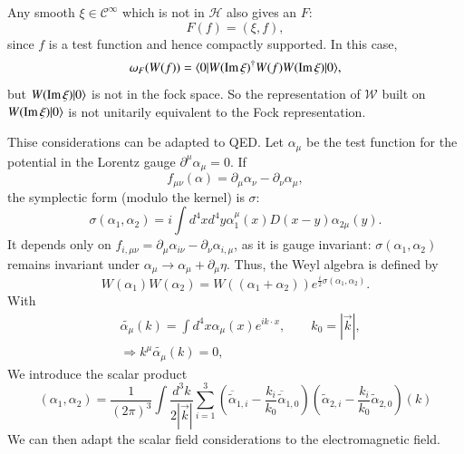 Any smooth $\xi \in \mathcal{C}^\infty$ which is not in $\mathcal{H}$ also gives an $F$:
\begin{equation}
  F(f)= (\xi, f), \label{chap1-eq2.25}
\end{equation}
since $f$ is a test function and hence compactly supported. In this case,
\begin{equation}
\omega_F (W(f))= \langle 0| W (\operatorname{\mathrm{Im}} \xi)^\dagger W (f)W (\operatorname{\mathrm{Im}} \xi)|0\rangle, \label{chap1-eq2.26}
\end{equation}
but $W (\operatorname{\mathrm{Im}} \xi)|0 \rangle$ is not in the fock space. So the representation of $\mathcal{W}$ built on $W (\operatorname{\mathrm{Im}} \xi)|0 \rangle$ is not unitarily equivalent to the Fock representation.

Thise considerations can be adapted to QED. Let $\alpha_\mu$ be the test function for the potential in the Lorentz gauge $\partial^\mu \alpha_\mu =0$. If
\begin{equation}
f_{\mu \nu} (\alpha) = \partial_{\mu} \alpha_{\nu}- \partial_\nu \alpha_\mu, \label{chap1-eq-2.27}
\end{equation}
the symplectic form (modulo the kernel) is $\sigma:$
\begin{equation}
  \sigma (\alpha_1, \alpha_2) = i \int d^4 x d^4 y \alpha^\mu_1 (x) D (x-y) \alpha_{2 \mu} (y). \label{chap1-eq2.28}
\end{equation}
It depends only on $f_{i, \mu \nu}= \partial_\mu \alpha_{i \nu}- \partial_\nu \alpha_{i, \mu}$, as it is gauge invariant: $\sigma(\alpha_1, \alpha_2)$ remains invariant under $\alpha_\mu \to \alpha_\mu + \partial_{\mu} \eta$. Thus, the Weyl algebra is defined by
\begin{equation}
W (\alpha_1) W (\alpha_2)= W ((\alpha_1 + \alpha_2)) e^{\frac{i}{2} \sigma(\alpha_1, \alpha_2)}. \label{chap1-eq2.29}
\end{equation}
With
\begin{align}
  &\tilde{\alpha_\mu} (k) = \int d^4 x \alpha_\mu (x)e^{ik\cdot x}, \qquad k_0 = |\overrightarrow{k}|,\label{chap1-eq2.30}\\
  &\Longrightarrow k^{\mu} \tilde{\alpha_\mu} (k)=0,\label{chap1-eq2.31}
\end{align}
We introduce the scalar product
\begin{equation}
(\alpha_1, \alpha_2)= \frac{1}{(2\pi)^3} \int \frac{d^3 k}{2|\overrightarrow{k}|} \sum^3_{i=1} \left(\overline{\tilde{\alpha}}_{1, i} -  \frac{k_i}{k_0} \overline{\tilde{\alpha}}_{1, 0}\right) (\tilde{\alpha}_{2, i}- \frac{k_i}{k_0} \tilde{\alpha}_{2, 0})(k) \label{chap1-eq2.32}
\end{equation}
We can then adapt the scalar field considerations to the electromagnetic field.

